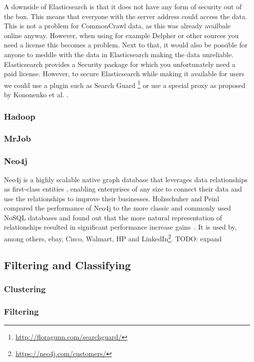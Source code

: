 A downside of Elasticsearch is that it does not have any form of security out of the box. This means that everyone with the server address could access the data. This is not a problem for CommonCrawl data, as this was already availbale online anyway. However, when using for example Delpher or other sources you need a license this becomes a problem. Next to that, it would also be possible for anyone to meddle with the data in Elasticsearch making the data unreliable. Elasticsearch provides a Security package for which you unfortunately need a paid license. However, to secure Elasticsearch while making it available for users we could use a plugin such as Search Guard \footnote{\url{http://floragunn.com/searchguard/}} or use a special proxy as proposed by Kononenko et al. \cite{Kononenko2014}.

\subsubsection{Hadoop}
\subsubsection{MrJob}

\subsubsection{Neo4j}
Neo4j is a highly scalable native graph database that leverages data relationships as first-class entities \cite{neo4j}, enabling enterprises of any size to connect their data and use the relationships to improve their businesses. Holzschuher and Peinl compared the performance of Neo4j to the more classic and commonly used NoSQL databases and found out that the more natural representation of relationships resulted in significant performance increase gains~\cite{holzschuher2013performance}. It is used by, among others, ebay, Cisco, Walmart, HP and LinkedIn\footnote{\url{https://neo4j.com/customers/}}.
TODO: expand

\subsection{Filtering and Classifying}

\subsubsection{Clustering}
\subsubsection{Filtering}

